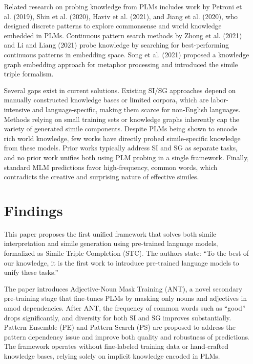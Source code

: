 \documentclass[12pt]{article}
\begin{document}
Related research on probing knowledge from PLMs includes work by Petroni et al. (2019), Shin et al. (2020), Haviv et al. (2021), and Jiang et al. (2020), who designed discrete patterns to explore commonsense and world knowledge embedded in PLMs. Continuous pattern search methods by Zhong et al. (2021) and Li and Liang (2021) probe knowledge by searching for best-performing continuous patterns in embedding space. Song et al. (2021) proposed a knowledge graph embedding approach for metaphor processing and introduced the simile triple formalism.

Several gaps exist in current solutions. Existing SI/SG approaches depend on manually constructed knowledge bases or limited corpora, which are labor-intensive and language-specific, making them scarce for non-English languages. Methods relying on small training sets or knowledge graphs inherently cap the variety of generated simile components. Despite PLMs being shown to encode rich world knowledge, few works have directly probed simile-specific knowledge from these models. Prior works typically address SI and SG as separate tasks, and no prior work unifies both using PLM probing in a single framework. Finally, standard MLM predictions favor high-frequency, common words, which contradicts the creative and surprising nature of effective similes.

\section{Findings}

This paper proposes the first unified framework that solves both simile interpretation and simile generation using pre-trained language models, formalized as Simile Triple Completion (STC). The authors state: ``To the best of our knowledge, it is the first work to introduce pre-trained language models to unify these tasks.''

The paper introduces Adjective-Noun Mask Training (ANT), a novel secondary pre-training stage that fine-tunes PLMs by masking only nouns and adjectives in amod dependencies. After ANT, the frequency of common words such as ``good'' drops significantly, and diversity for both SI and SG improves substantially. Pattern Ensemble (PE) and Pattern Search (PS) are proposed to address the pattern dependency issue and improve both quality and robustness of predictions. The framework operates without fine-labeled training data or hand-crafted knowledge bases, relying solely on implicit knowledge encoded in PLMs.
\end{document}
